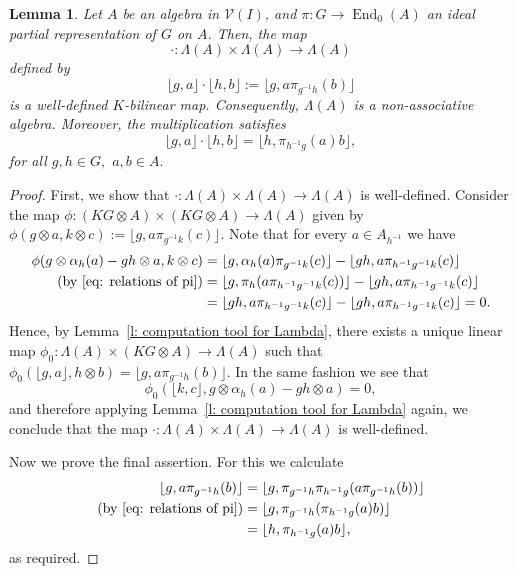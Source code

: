\documentclass[11pt]{amsart}
\numberwithin{equation}{section}
\newtheorem{lemma}[theorem]{Lemma}
\theoremstyle{definition}
\theoremstyle{remark}
\begin{document}
\begin{lemma} \label{l: product}
    Let \( A \) be an algebra in \( \mathcal{V}(I) \), and \( \pi: G \to \operatorname{End}_0(A) \)  an ideal partial representation  of $G$ on \(A\). Then, the map 
    \[
        \cdot : \Lambda(A) \times \Lambda(A) \to \Lambda(A)
    \]
    defined by 
    \[
        \lfloor g, a \rfloor \cdot \lfloor h, b \rfloor := \lfloor g, a \pi_{g^{-1}h}(b) \rfloor
    \]
    is a well-defined \( K \)-bilinear map.
    Consequently, \(\Lambda(A)\) is a non-associative algebra.
    Moreover, the multiplication satisfies 
   \begin{equation} \label{eq: multiplication equivalence}
        \lfloor g, a \rfloor \cdot \lfloor h, b \rfloor
        = \lfloor h, \pi_{h^{-1}g}(a) b \rfloor,
    \end{equation} for all $g,h \in G,$ $a,b \in A.$
    
\end{lemma}

\begin{proof}
    First, we show that \( \cdot : \Lambda(A) \times \Lambda(A) \to \Lambda(A) \) is well-defined.    Consider the map \( \phi: (KG \otimes A)  \times (KG \otimes A) \to \Lambda(A) \) given  by \( \phi(g \otimes a, k \otimes c) := \lfloor g, a \pi_{g^{-1}k}(c) \rfloor \).
        Note that for every \( a \in A_{h^{-1}} \) we have
        \begin{align*}
            \phi( g \otimes \alpha_{h}(a) - gh \otimes a, k \otimes c)
            &= \lfloor g,\alpha_h(a)\pi_{g^{-1}k}(c)\rfloor-\lfloor gh,a\pi_{h^{-1}g^{-1}k}(c)\rfloor \\ 
            (\text{by }\eqref{eq: relations of pi})&= \lfloor g,\pi_h(a\pi_{h^{-1}g^{-1}k}(c))\rfloor-\lfloor gh,a\pi_{h^{-1}g^{-1}k}(c)\rfloor \\
            &=\lfloor gh,a\pi_{h^{-1}g^{-1}k}(c)\rfloor-\lfloor gh,a\pi_{h^{-1}g^{-1}k}(c)\rfloor=0.
        \end{align*}
        Hence, by Lemma~\ref{l: computation tool for Lambda}, there exists a unique linear map \( \phi_0 : \Lambda(A) \times  (KG \otimes A) \to \Lambda(
            A) \) such that  \(\phi_0( \lfloor g, a \rfloor , h \otimes b ) = \lfloor g, a \pi_{g^{-1}h}(b) \rfloor \).
        In the same fashion we see that
        \[
            \phi_0(\lfloor k, c \rfloor, g \otimes \alpha_{h}(a) - gh \otimes a) = 0,
        \]
        and therefore applying Lemma~\ref{l: computation tool for Lambda} again,  we conclude that the map \( \cdot : \Lambda(A) \times \Lambda(A) \to \Lambda(A) \) is well-defined.

    Now we prove the final assertion. For this we calculate
    \begin{align*}
        \lfloor g, a \pi_{g^{-1}h}(b) \rfloor 
        &= \lfloor g, \pi_{g^{-1}h} \pi_{h^{-1}g}(a \pi_{g^{-1}h}(b)) \rfloor  \\
        (\text{by }\eqref{eq: relations of pi})&=\lfloor g, \pi_{g^{-1}h}(\pi_{h^{-1}g}(a) b) \rfloor \\
        &= \lfloor h, \pi_{h^{-1}g}(a) b \rfloor,
    \end{align*}
    as required.
\end{proof}
\end{document}
